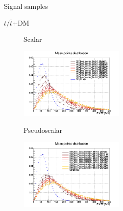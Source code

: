 \documentclass[8pt]{beamer}
\begin{document}
\begin{frame}{Signal samples}
\justifying
\begin{block}{\centering $t/\bar t$+DM}\end{block} \vspace{-10pt}
\begin{figure}[htbp]
\centering
\begin{minipage}[b]{.49\textwidth}
\vspace{-5pt}
\begin{block}{\centering Scalar}\end{block}
\begin{center}
\includegraphics[width=5.2cm, height=3.5cm]{figs/singleTopScalarMETNorm.png}
\end{center}
\end{minipage}
\begin{minipage}[b]{.02\textwidth}\end{minipage}
\begin{minipage}[b]{.49\textwidth}
\vspace{-5pt}
\begin{block}{\centering Pseudoscalar}\end{block}
\begin{center}
\includegraphics[width=5.2cm, height=3.5cm]{figs/singleTopPseudoMETNorm.png}
\end{center}
\end{minipage}
\end{figure} \vfill


\end{frame}
\end{document}
